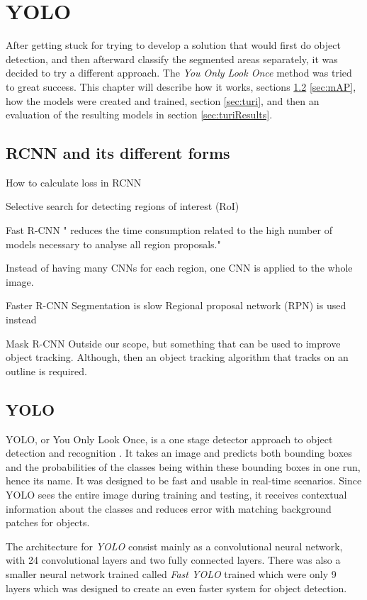 \chapter{YOLO}
After getting stuck for trying to develop a solution that would first do object detection, and then afterward classify the segmented areas separately, it was decided to try a different approach. The \textit{You Only Look Once} method was tried to great success. This chapter will describe how it works, sections \ref{sec:yolo} \ref{sec:mAP}, how the models were created and trained, section \ref{sec:turi}, and then an evaluation of the resulting models in section \ref{sec:turiResults}.

\section{RCNN and its different forms}

How to calculate loss in RCNN

Selective search for detecting regions of interest (RoI)

Fast R-CNN
" reduces the time consumption related to the high number of models necessary to analyse all region proposals."

Instead of having many CNNs for each region, one CNN is applied to the whole image.

Faster R-CNN
Segmentation is slow
Regional proposal network (RPN) is used instead

Mask R-CNN
Outside our scope, but something that can be used to improve object tracking.
Although, then an object tracking algorithm that tracks on an outline is required.

\section{YOLO}
\label{sec:yolo}
YOLO, or You Only Look Once, is a one stage detector approach to object detection and
 recognition \cite{YOLO1}. It takes an image and predicts both bounding boxes and the probabilities of the classes being within these bounding boxes in one run, hence its name. It was designed to be fast and usable in real-time scenarios. Since YOLO sees the entire image during training and testing, it receives contextual information about the classes and reduces error with matching background patches for objects. 
 
 The architecture for \textit{YOLO} consist mainly as a convolutional neural network, with 24 convolutional layers and two fully connected layers. There was also a smaller neural network trained called \textit{Fast YOLO} trained which were only 9 layers which was designed to create an even faster system for object detection. 
 
